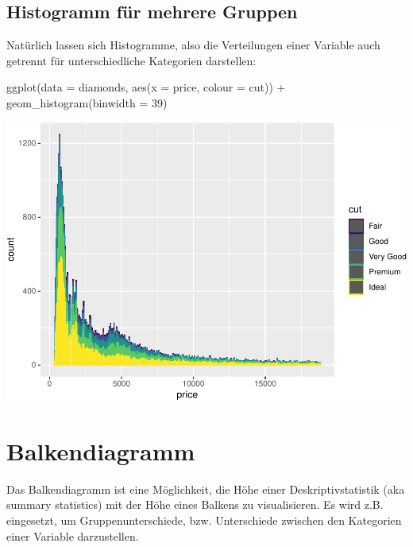 \documentclass[
]{book}
\newenvironment{Shaded}{\begin{snugshade}}{\end{snugshade}}
\newcommand{\AttributeTok}[1]{\textcolor[rgb]{0.77,0.63,0.00}{#1}}
\newcommand{\DecValTok}[1]{\textcolor[rgb]{0.00,0.00,0.81}{#1}}
\newcommand{\FunctionTok}[1]{\textcolor[rgb]{0.00,0.00,0.00}{#1}}
\newcommand{\NormalTok}[1]{#1}
\newcommand{\SpecialCharTok}[1]{\textcolor[rgb]{0.00,0.00,0.00}{#1}}
\begin{document}
\hypertarget{histogramm-fuxfcr-mehrere-gruppen}{%
\subsection{Histogramm für mehrere Gruppen}\label{histogramm-fuxfcr-mehrere-gruppen}}

Natürlich lassen sich Histogramme, also die Verteilungen einer Variable auch getrennt für unterschiedliche Kategorien darstellen:

\begin{Shaded}
\begin{Highlighting}[]
\FunctionTok{ggplot}\NormalTok{(}\AttributeTok{data =}\NormalTok{ diamonds, }\FunctionTok{aes}\NormalTok{(}\AttributeTok{x =}\NormalTok{ price, }\AttributeTok{colour =}\NormalTok{ cut)) }\SpecialCharTok{+}
  \FunctionTok{geom\_histogram}\NormalTok{(}\AttributeTok{binwidth =} \DecValTok{39}\NormalTok{)}
\end{Highlighting}
\end{Shaded}

\includegraphics{CFH_R_bookdown_files/figure-latex/unnamed-chunk-163-1.pdf}

\hypertarget{balkendiagramm}{%
\section{Balkendiagramm}\label{balkendiagramm}}

Das Balkendiagramm ist eine Möglichkeit, die Höhe einer Deskriptivstatistik (aka summary statistics) mit der Höhe eines Balkens zu visualisieren. Es wird z.B. eingesetzt, um Gruppenunterschiede, bzw. Unterschiede zwischen den Kategorien einer Variable darzustellen.
\end{document}
